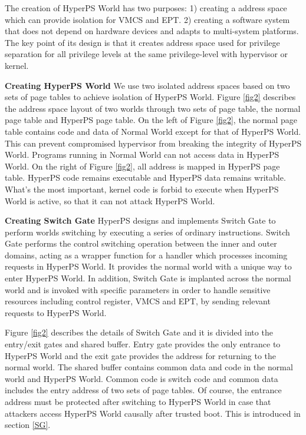 \documentclass[conference]{IEEEtran}
\begin{document}
The creation of HyperPS World has two purposes: 1) creating a address space which can provide isolation for VMCS and EPT. 2) creating a software system that does not depend on hardware devices and adapts to multi-system platforms. The key point of its design is that it creates address space used for privilege separation for all privilege levels at the same privilege-level with hypervisor or kernel. 

\textbf{Creating HyperPS World}
 We use two isolated address spaces based on two sets of page tables to achieve isolation of HyperPS World.
Figure \ref{fig2} describes the address space layout of two worlds through two sets of page table, the normal page table and HyperPS page table. On the left of Figure \ref{fig2}, the normal page table contains code and data of Normal World except for that of HyperPS World. This can prevent compromised hypervisor from breaking the integrity of HyperPS World. Programs running in Normal World can not access data in HyperPS World. On the right of Figure \ref{fig2}, all address is mapped in HyperPS page table.
HyperPS code remains executable and HyperPS data remains writable. What's the most important, kernel code is forbid to execute when HyperPS World is active, so that it can not attack HyperPS World.






\textbf{Creating Switch Gate}
HyperPS designs and implements Switch Gate to perform worlds switching by executing a series of ordinary instructions.
Switch Gate performs the control switching operation between the inner and outer domains, acting as a wrapper function for a handler which processes incoming requests in HyperPS World. It provides the normal world with a unique way to enter HyperPS World. In addition, Switch Gate is implanted across the normal world and is invoked with specific parameters in order to handle sensitive resources including control register, VMCS and EPT, by sending relevant requests to HyperPS World.

Figure \ref{fig2} describes the details of Switch Gate and it is divided into the entry/exit gates and shared buffer.
Entry gate provides the only entrance to HyperPS World and the exit gate provides the address for returning to the normal world. The shared buffer contains common data and code in the normal world and HyperPS World. Common code is switch code and common data includes the entry address of two sets of page tables.
 Of course, the entrance address must be protected after switching to HyperPS World in case that attackers access HyperPS World causally after trusted boot. This is introduced in section \ref{SG}.
\end{document}
